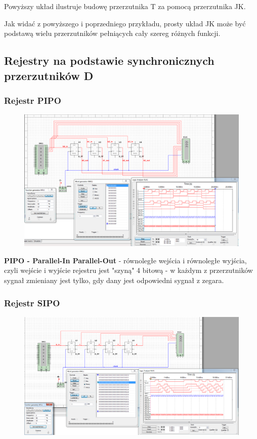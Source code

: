 \documentclass[12pt,a4paper]{article}
\begin{document}
Powyższy układ ilustruje budowę przerzutnika T za pomocą przerzutnika JK. 

Jak widać z powyższego i poprzedniego przykładu, prosty układ JK może być podstawą wielu przerzutników pełniących cały szereg różnych funkcji. 
\subsection{Rejestry na podstawie synchronicznych przerzutników D}

\subsubsection{Rejestr PIPO}
\begin{figure}[H]
\centering
\includegraphics[width=\textwidth]{img/3hPIPO}
\end{figure}
\textbf{PIPO - Parallel-In Parallel-Out} - równoległe wejścia i równoległe wyjścia, czyli wejście i wyjście rejestru jest "szyną" 4 bitową - w każdym z przerzutników sygnał zmieniany jest tylko, gdy dany jest odpowiedni sygnał z zegara.

\subsubsection{Rejestr SIPO}
\begin{figure}[H]
\centering
\includegraphics[width=\textwidth]{img/3hSIPO}
\end{figure}
\end{document}
